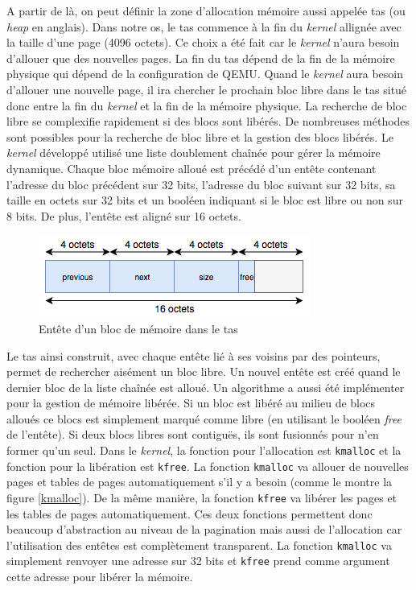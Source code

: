 A partir de là, on peut définir la zone d'allocation mémoire aussi appelée tas
(ou \textit{heap} en anglais). Dans notre \acrshort{os}, le tas commence à la
fin du \textit{kernel} allignée avec la taille d'une page (4096 octets). Ce choix
a été fait car le \textit{kernel} n'aura besoin d'allouer que des nouvelles
pages. La fin du tas dépend de la fin de la mémoire physique qui dépend de la
configuration de QEMU. Quand le \textit{kernel} aura besoin d'allouer une nouvelle
page, il ira chercher le prochain bloc libre dans le tas situé donc entre la fin
du \textit{kernel} et la fin de la mémoire physique. La recherche de bloc libre
se complexifie rapidement si des blocs sont libérés. De nombreuses méthodes sont
possibles pour la recherche de bloc libre et la gestion des blocs libérés. Le
\textit{kernel} développé utilisé une liste doublement chaînée pour gérer la
mémoire dynamique. Chaque bloc mémoire alloué est précédé d'un entête contenant
l'adresse du bloc précédent sur 32 bits, l'adresse du bloc suivant sur 32 bits,
sa taille en octets sur 32 bits et un booléen indiquant si le bloc est libre ou
non sur 8 bits. De plus, l'entête est aligné sur 16 octets.

\begin{figure}[!h]
  \centering
  \includegraphics[scale=0.7]{images/heap_header.png}
  \caption{Entête d'un bloc de mémoire dans le tas}
  \label{heap_header}
\end{figure}

Le tas ainsi construit, avec chaque entête lié à ses voisins par des pointeurs,
permet de rechercher aisément un bloc libre. Un nouvel entête est créé quand le
dernier bloc de la liste chaînée est alloué. Un algorithme a aussi été implémenter
pour la gestion de mémoire libérée. Si un bloc est libéré au milieu de blocs
alloués ce blocs est simplement marqué comme libre (en utilisant le booléen \textit{free}
de l'entête). Si deux blocs libres sont contiguës, ils sont fusionnés pour n'en
former qu'un seul. Dans le \textit{kernel}, la fonction pour l'allocation est
\texttt{kmalloc} et la fonction pour la libération est \texttt{kfree}.
La fonction \texttt{kmalloc} va allouer de nouvelles pages et tables
de pages automatiquement s'il y a besoin (comme le montre la figure \ref{kmalloc}).
De la même manière, la fonction \texttt{kfree} va libérer les pages et
les tables de pages automatiquement. Ces deux fonctions permettent donc beaucoup
d'abstraction au niveau de la pagination mais aussi de l'allocation car l'utilisation
des entêtes est complètement transparent. La fonction \texttt{kmalloc}
va simplement renvoyer une adresse sur 32 bits et \texttt{kfree} prend
comme argument cette adresse pour libérer la mémoire.

